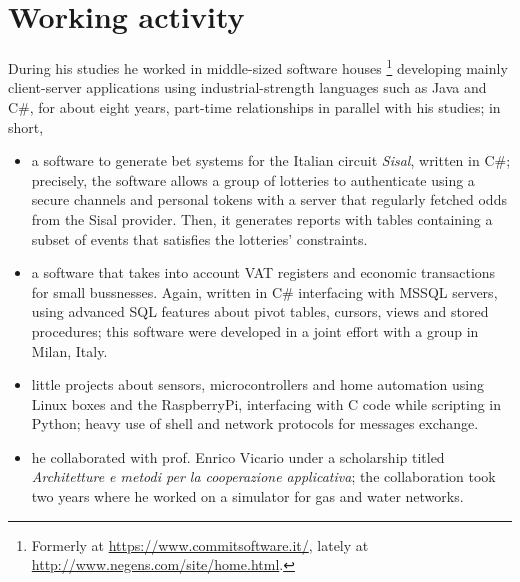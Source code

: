 \documentclass[a4paper]{article} %
\begin{document}
    \section{Working activity}

    During his studies he worked in middle-sized software houses
    \footnote{Formerly at \url{https://www.commitsoftware.it/}, lately at
    \url{http://www.negens.com/site/home.html}.} developing mainly client-server
    applications using industrial-strength languages such as Java and C\#, for
    about eight years, part-time relationships in parallel with his studies; in short,
    \begin{itemize}
        \item a software to generate bet systems for the Italian circuit
        \textit{Sisal}, written in C\#; precisely, the software allows a group
        of lotteries to authenticate using a secure channels and personal
        tokens with a server that regularly fetched odds from the Sisal
        provider. Then, it generates reports with tables containing a
        subset of events that satisfies the lotteries' constraints.
        \item a software that takes into account VAT registers and economic
        transactions for small bussnesses. Again, written in C\# interfacing 
        with MSSQL servers, using advanced SQL features about pivot tables,
        cursors, views and stored procedures; this software were developed in
        a joint effort with a group in Milan, Italy.
        \item little projects about sensors, microcontrollers and home
        automation using Linux boxes and the RaspberryPi, interfacing with C
        code while scripting in Python; heavy use of shell and network protocols
        for messages exchange.
        \item he collaborated with prof. Enrico Vicario under a scholarship titled
        \textit{Architetture e metodi per la cooperazione applicativa}; the collaboration
        took two years where he worked on a simulator for gas and water networks.
    \end{itemize}
    
    
\end{document}
